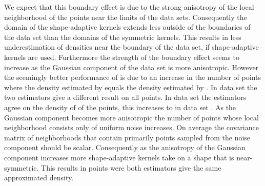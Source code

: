 			We expect that this boundary effect is due to the strong anisotropy of the local neighborhood of the points near the limits of the data sets. Consequently the domain of the shape-adaptive kernels extends less outside of the boundaries of the data set than the domains of the symmetric kernels. This results in less underestimation of densities near the boundary of the data set, if shape-adaptive kernels are used.
			Furthermore the strength of the boundary effect seems to increase as the Gaussian component of the data set is more anisotropic. However the seemingly better performance of \sambe is due to an increase in the number of points where the density estimated by \sambe equals the density estimated by \mbe. In data set \ferdosiOne the two estimators give a different result on all points. In data set \baakmanOne the estimators agree on the density of  of the points, this increases to  in data set \baakmanFive.
			As the Gaussian component becomes more anisotropic the number of points whose local neighborhood consists only of uniform noise increases. On average the covariance matrix of neighborhoods that contain primarily points sampled from the noise component should be scalar. Consequently as the anisotropy of the Gaussian component increases more shape-adaptive kernels take on a shape that is near-symmetric. This results in points were both estimators give the same approximated density. 
	
